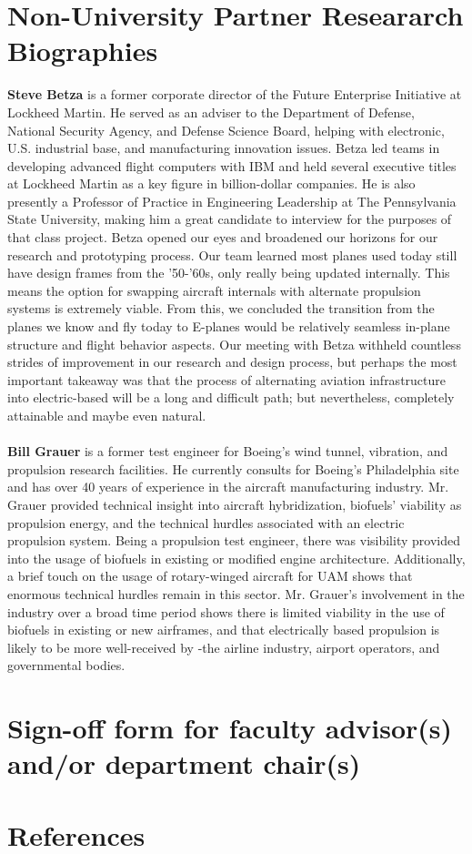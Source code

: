 \documentclass{article}
\begin{document}
\newpage
\section{Non-University Partner Researarch Biographies}\label{apxC}
\begin{singlespace}
\noindent\textbf{Steve Betza} is a former corporate director of the Future Enterprise Initiative at Lockheed Martin. 
He served as an adviser to the Department of Defense, National Security Agency, and Defense Science Board, helping with electronic, U.S. industrial base, and manufacturing innovation issues. 
Betza led teams in developing advanced flight computers with IBM and held several executive titles at Lockheed Martin as a key figure in billion-dollar companies. 
He is also presently a Professor of Practice in Engineering Leadership at The Pennsylvania State University, making him a great candidate to interview for the purposes of that class project. 
Betza opened our eyes and broadened our horizons for our research and prototyping process. 
Our team learned most planes used today still have design frames from the '50-'60s, only really being updated internally. 
This means the option for swapping aircraft internals with alternate propulsion systems is extremely viable. 
From this, we concluded the transition from the planes we know and fly today to E-planes would be relatively seamless in-plane structure and flight behavior aspects. 
Our meeting with Betza withheld countless strides of improvement in our research and design process, but perhaps the most important takeaway was that the process of alternating aviation infrastructure into electric-based will be a long and difficult path; but nevertheless, completely attainable and maybe even natural.\\~\\
\noindent\textbf{Bill Grauer} is a former test engineer for Boeing's wind tunnel, vibration, and propulsion research facilities.
He currently consults for Boeing’s Philadelphia site and has over 40 years of experience in the aircraft manufacturing industry. 
Mr. Grauer provided technical insight into aircraft hybridization, biofuels' viability as propulsion energy, and the technical hurdles associated with an electric propulsion system. 
Being a propulsion test engineer, there was visibility provided into the usage of biofuels in existing or modified engine architecture. 
Additionally, a brief touch on the usage of rotary-winged aircraft for UAM shows that enormous technical hurdles remain in this sector. 
Mr. Grauer’s involvement in the industry over a broad time period shows there is limited viability in the use of biofuels in existing or new airframes, and that electrically based propulsion is likely to be more well-received by -the airline industry, airport operators, and governmental bodies. 

\end{singlespace}

\section{Sign-off form for faculty advisor(s) and/or department chair(s)}\label{apxD}
\blindtext
\section{References}
\printbibliography[heading = none]
\cite{fuelSpecs}
\end{document}
